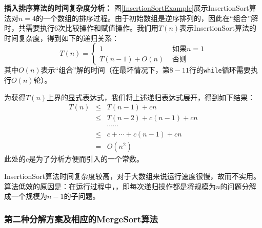 %
%
%
%
%
%
%
%
	

{\bf 插入排序算法的时间复杂度分析：}
图\ref{InsertionSortExample}展示{\sc InsertionSort}算法对$n=4$的一个数组的排序过程。由于初始数组是逆序排列的，因此在“组合”解时，共需要执行6次比较操作和赋值操作。我们用$T(n)$表示{\sc InsertionSort}算法的时间复杂度，得到如下的递归关系：
\[
	T(n) = \begin{cases} 
		1 & \text{ 如果} n = 1 \nonumber \\ 
	 T(n-1) + O(n)  & \text{ 否则}  \nonumber 
	 	\end{cases}
\]
其中$O(n)$表示“组合”解的时间（在最坏情况下，第$8-11$行的{\tt while}循环需要执行$O(n)$轮）。

为获得$T(n)$上界的显式表达式，我们将上述递归表达式展开，得到如下结果：
\begin{eqnarray}
T(n) &\leq& T(n-1) + c n \nonumber \\ 
       &\leq& T(n-2) + c (n-1) + c n \nonumber \\
       & & \cdots \cdots \nonumber \\ 
       &\leq& c + \cdots + c (n-1) + c n \nonumber \\
       &=& O(n^{2}) \nonumber 
\end{eqnarray}
此处的$c$是为了分析方便而引入的一个常数。

{\sc InsertionSort}算法时间复杂度较高，对于大数组来说运行速度很慢，故而不实用。算法低效的原因是：在运行过程中，，即每次递归操作都是将规模为$n$的问题分解成一个规模为$n-1$的子问题。



\subsubsection*{第二种分解方案及相应的{\sc MergeSort}算法}

